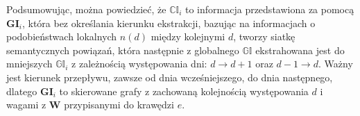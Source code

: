 Podsumowując, można powiedzieć, że $\mathbb{CI}_i$ to informacja przedstawiona za pomocą
$\mathbf{GI}_i$, która bez określania kierunku ekstrakcji, bazując na informacjach
o podobieństwach lokalnych $n(d)$ między kolejnymi $d$, tworzy siatkę semantycznych powiązań,
która następnie z globalnego $\mathbb{GI}$ ekstrahowana jest do mniejszych $\mathbb{GI}_i$
z zależnością występowania dni: $d \xrightarrow{} d+1$ oraz $d-1 \xrightarrow{} d$. 
Ważny jest kierunek przepływu, zawsze od dnia wcześniejszego, do dnia następnego, dlatego 
$\mathbf{GI}_i$ to skierowane grafy z zachowaną kolejnością występowania $d$ 
i wagami z $\mathbf{W}$ przypisanymi do krawędzi $e$.
